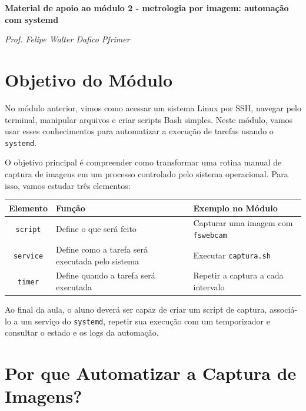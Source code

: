 \documentclass[12pt]{article}
\begin{document}
\begin{center}
\textbf{\Large Material de apoio ao módulo 2 - metrologia por imagem: automação com systemd}

\vspace{0.5cm}

\textit{Prof. Felipe Walter Dafico Pfrimer}

\vspace{1cm}
\end{center}

\section{Objetivo do Módulo}

No módulo anterior, vimos como acessar um sistema Linux por SSH, navegar pelo terminal, manipular arquivos e criar scripts Bash simples. Neste módulo, vamos usar esses conhecimentos para automatizar a execução de tarefas usando o \texttt{systemd}.

O objetivo principal é compreender como transformar uma rotina manual de captura de imagens em um processo controlado pelo sistema operacional. Para isso, vamos estudar três elementos:

\begin{cmdbox}
\begin{tabularx}{\linewidth}{@{}C >{\raggedright\arraybackslash}X >{\raggedright\arraybackslash}X@{}}
\toprule
\textbf{Elemento} & \textbf{Função} & \textbf{Exemplo no Módulo} \\
\midrule
\texttt{script} & Define o que será feito & Capturar uma imagem com \texttt{fswebcam} \\
\texttt{service} & Define como a tarefa será executada pelo sistema & Executar \texttt{captura.sh} \\
\texttt{timer} & Define quando a tarefa será executada & Repetir a captura a cada intervalo \\
\bottomrule
\end{tabularx}
\end{cmdbox}

Ao final da aula, o aluno deverá ser capaz de criar um script de captura, associá-lo a um serviço do \texttt{systemd}, repetir sua execução com um temporizador e consultar o estado e os logs da automação.

\section{Por que Automatizar a Captura de Imagens?}
\end{document}
